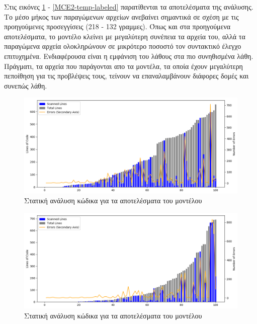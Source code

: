 Στις εικόνες \ref{static-temp-char} - \ref{MCE2-temp-labeled} παρατίθενται τα αποτελέσματα της ανάλυσης.
Το μέσο μήκος των παραγώμενων αρχείων ανεβαίνει σημαντικά σε σχέση με τις προηγούμενες προσεγγίσεις (218 - 132 γραμμες).
Όπως και στα προηγούμενα αποτελέσματα, το μοντέλο  κλείνει με μεγαλύτερη συνέπεια τα αρχεία του, αλλά τα παραγώμενα αρχεία ολοκληρώνουν σε μικρότερο ποσοστό τον συντακτικό έλεγχο επιτυχημένα.
Ενδιαφέρουσα είναι η εμφάνιση του λάθους  στα πιο συνηθισμένα λάθη.
Πράγματι, τα αρχεία που παράγονται απο τα μοντέλα, τα οποία έχουν μεγαλύτερη πεποίθηση για τις προβλέψεις τους, τείνουν να επαναλαμβάνουν διάφορες δομές και συνεπώς λάθη.

\begin{figure}
	\caption{Στατική ανάλυση κώδικα για τα αποτελέσματα του  μοντέλου}
	\label{static-temp-char}
	\includegraphics[width=\textwidth, keepaspectratio]{images/temp-char.png}
\end{figure}

\begin{figure}
	\caption{Στατική ανάλυση κώδικα για τα αποτελέσματα του  μοντέλου}
	\label{static-temp-labeled}
	\includegraphics[width=\textwidth, keepaspectratio]{images/temp-labeled.png}
\end{figure}

